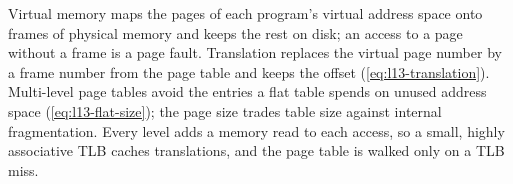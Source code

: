 \documentclass[../main.tex]{subfiles}
\begin{document}
\begin{keypoint}
  Virtual memory maps the pages of each program's virtual address space onto
  frames of physical memory and keeps the rest on disk; an access to a page
  without a frame is a page fault.  Translation replaces the virtual page
  number by a frame number from the page table and keeps the offset
  (\cref{eq:l13-translation}).
  Multi-level page tables avoid the entries a flat table spends on unused
  address space (\cref{eq:l13-flat-size}); the page size trades table size
  against internal fragmentation.  Every level adds a memory read to each
  access, so a small, highly associative TLB caches translations, and the
  page table is walked only on a TLB miss.
\end{keypoint}
\end{document}
